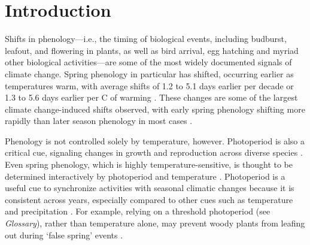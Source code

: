\documentclass{article}
\begin{document}
\newpage
\section*{Introduction}

\par Shifts in phenology---i.e., the timing of biological events, including budburst, leafout, and flowering in plants, as well as bird arrival, egg hatching and myriad other biological activities---are some of the most widely documented signals of climate change. Spring phenology in particular has shifted, occurring earlier as temperatures warm, with average shifts of 1.2 to 5.1 days earlier per decade \citep{bradley1999,parmesan2003, poloczanska2013,root2003} or 1.3 to 5.6 days earlier per \degree C of warming \citep{polgar2013,Wolkovich:2012n}. These changes are some of the largest climate change-induced shifts observed, with early spring phenology shifting more rapidly than later season phenology in most cases \citep{bradley1999,menzel2006}. 

\par Phenology is not controlled solely by temperature, however. Photoperiod is also a critical cue, signaling changes in growth and reproduction across diverse species \citep[e.g.,][]{flynn2018,lagercrantz2009,bradshaw2007,Howe:1996,solbakken1994}. Even spring phenology, which is highly temperature-sensitive, is thought to be determined interactively by photoperiod and temperature \citep[][see also Box 1]{fu2019}. Photoperiod is a useful cue to synchronize activities with seasonal climatic changes \citep[e.g.,][]{Singh:2017, Basler:2012, Hsu:2011} because it is consistent across years, especially compared to other cues such as temperature and precipitation \citep{saikkonen2012}.  For example, relying on a threshold photoperiod (see \emph{Glossary}), rather than temperature alone, may prevent woody plants from leafing out during `false spring' events \citep[unusually warm periods during winter and early spring that are followed by a return to cold temperatures,][]{gu2008}. %
\end{document}
